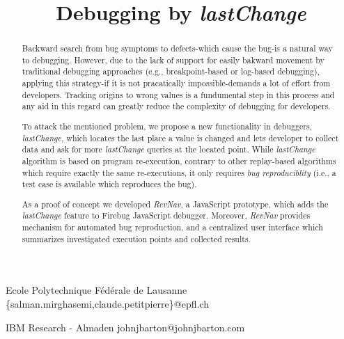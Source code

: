 \documentclass[preprint]{sigplanconf}
\begin{document}
\copyrightdata{[to be supplied]} 

\preprintfooter{}   %

\title{Debugging by \textit{lastChange}}
\subtitle{}

           {Ecole Polytechnique F\'ed\'erale de Lausanne}
           {\{salman.mirghasemi,claude.petitpierre\}@epfl.ch}

           {IBM Research - Almaden}
           {johnjbarton@johnjbarton.com}

\maketitle

\begin{abstract}
Backward search from bug symptoms to defects-which cause the bug-is a natural way to debugging. However, due to the lack of support for easily bakward movement by  traditional debugging approaches (e.g., breakpoint-based or log-based debugging), applying this strategy-if it is not pracatically impossible-demands a lot of effort from developers. Tracking origins to wrong values is a fundumental step in this process and any aid in this regard can greatly reduce the complexity of debugging for developers.

To attack the mentioned problem, we propose a new functionality in debuggers, \textit{lastChange}, which locates the last place a value is changed and lets developer to collect data and ask for more \textit{lastChange} queries at the located point. While \textit{lastChange} algorithm is based on program re-execution, contrary to other replay-based algorithms which require exactly the same re-executions, it only requires \textit{bug reproduciblity} (i.e., a test case is available which reproduces the bug).

As a proof of concept we developed \textit{RevNav}, a JavaScript prototype, which adds the \textit{lastChange} feature to Firebug JavaScript debugger. Moreover, \textit{RevNav} provides mechanism for automated bug reproduction, and a centralized user interface which summarizes investigated execution points and collected results.

\end{abstract}
\end{document}
